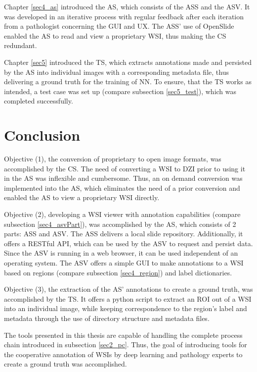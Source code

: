 Chapter \ref{sec4_as} introduced the AS, which consists of the ASS and the ASV. It was developed in an iterative process with regular feedback after each iteration from a pathologist concerning the GUI and UX. The ASS' use of OpenSlide enabled the AS to read and view a proprietary WSI, thus making the CS redundant.

Chapter \ref{sec5} introduced the TS, which extracts annotations made and persisted by the AS into individual images with a corresponding metadata file, thus delivering a ground truth for the training of NN. To ensure, that the TS works as intended, a test case was set up (compare subsection \ref{sec5_test}), which was completed successfully.


\section{Conclusion}

Objective (1), the conversion of proprietary to open image formats, was accomplished by the CS. The need of converting a WSI to DZI prior to using it in the AS was inflexible and cumbersome. Thus, an on demand conversion was implemented into the AS, which eliminates the need of a prior conversion and enabled the AS to view a proprietary WSI directly.
 
Objective (2), developing a WSI viewer with annotation capabilities (compare subsection \ref{sec4_asvPart}), was accomplished by the AS, which consists of 2 parts: ASS and ASV. The ASS delivers a local slide repository. Additionally, it offers a RESTful API, which can be used by the ASV to request and persist data. Since the ASV is running in a web browser, it can be used independent of an operating system. The ASV offers a simple GUI to make annotations to a WSI based on regions (compare subsection \ref{sec4_region}) and label dictionaries.

Objective (3), the extraction of the AS' annotations to create a ground truth, was accomplished by the TS. It offers a python script to extract an ROI out of a WSI into an individual image, while keeping correspondence to the region's label and metadata through the use of directory structure and metadata files.

The tools presented in this thesis are capable of handling the complete process chain introduced in subsection \ref{sec2_pc}. Thus, the goal of introducing tools for the cooperative annotation of WSIs by deep learning and pathology experts to create a ground truth was accomplished.



